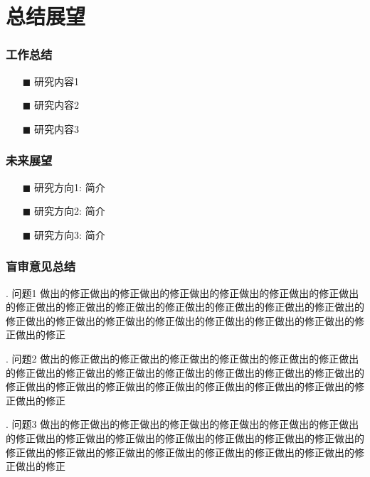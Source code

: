 \documentclass[9pt,fontset=windows]{ctexbeamer}
\begin{document}
	\section{总结展望}
	\begin{frame}
		\frametitle{工作总结}
		\begin{itemize}
			\heiti\Large
			\setlength{\itemsep}{10pt}
			\item[$\blacksquare$] 研究内容1
			\item[$\blacksquare$] 研究内容2
			\item[$\blacksquare$] 研究内容3
		\end{itemize}
	\end{frame}
	\begin{frame}
		\frametitle{未来展望}
		\begin{itemize}
			\heiti\Large
			\setlength{\itemsep}{10pt}
			\item[$\blacksquare$] {\SourceHeiBold 研究方向1}: 简介
			\item[$\blacksquare$] {\SourceHeiBold 研究方向2}: 简介
			\item[$\blacksquare$] {\SourceHeiBold 研究方向3}: 简介
		\end{itemize}
	\end{frame}
	\begin{frame}[t]
		\frametitle{盲审意见总结}
		\vspace{-2mm}
		\begin{alertblock}{. 问题1}
			\heiti 做出的修正做出的修正做出的修正做出的修正做出的修正做出的修正做出的修正做出的修正做出的修正做出的修正做出的修正做出的修正做出的修正做出的修正做出的修正做出的修正做出的修正做出的修正做出的修正做出的修正做出的修正做出的修正
		\end{alertblock}
		\vspace{3mm}
		\begin{alertblock}{. 问题2}
			\heiti 做出的修正做出的修正做出的修正做出的修正做出的修正做出的修正做出的修正做出的修正做出的修正做出的修正做出的修正做出的修正做出的修正做出的修正做出的修正做出的修正做出的修正做出的修正做出的修正做出的修正做出的修正做出的修正
		\end{alertblock}
		\vspace{3mm}
		\begin{alertblock}{. 问题3}
			\heiti 做出的修正做出的修正做出的修正做出的修正做出的修正做出的修正做出的修正做出的修正做出的修正做出的修正做出的修正做出的修正做出的修正做出的修正做出的修正做出的修正做出的修正做出的修正做出的修正做出的修正做出的修正做出的修正
		\end{alertblock}
	\end{frame}
\end{document}
